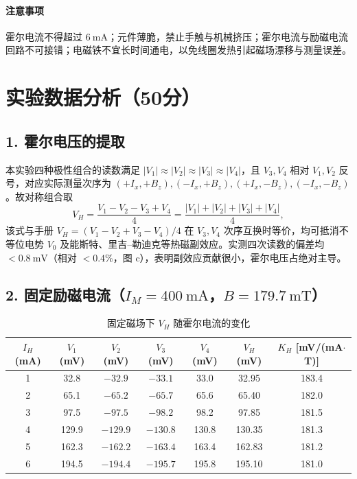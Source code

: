 \documentclass[12pt,a4paper]{ctexart}
\begin{document}
\paragraph{注意事项}
霍尔电流不得超过 $6\ \mathrm{mA}$；元件薄脆，禁止手触与机械挤压；霍尔电流与励磁电流回路不可接错；电磁铁不宜长时间通电，以免线圈发热引起磁场漂移与测量误差。

\section*{实验数据分析（50分）}

\subsection*{1. 霍尔电压的提取}
本实验四种极性组合的读数满足 $|V_1|\approx|V_2|\approx|V_3|\approx|V_4|$，且 $V_3,V_4$ 相对 $V_1,V_2$ 反号，对应实际测量次序为 $(+I_x,+B_z),(-I_x,+B_z),(+I_x,-B_z),(-I_x,-B_z)$。故对称组合取
\begin{equation}
    V_H=\frac{V_1-V_2-V_3+V_4}{4}=\frac{|V_1|+|V_2|+|V_3|+|V_4|}{4},
    \label{eq:VH2}
\end{equation}
该式与手册 $V_H=(V_1-V_2+V_3-V_4)/4$ 在 $V_3,V_4$ 次序互换时等价，均可抵消不等位电势 $V_0$ 及能斯特、里吉--勒迪克等热磁副效应。实测四次读数的偏差均 $<0.8\ \mathrm{mV}$（相对 $<0.4\%$，图 c），表明副效应贡献很小，霍尔电压占绝对主导。

\subsection*{2. 固定励磁电流（$I_M=400\ \mathrm{mA}$，$B=179.7\ \mathrm{mT}$）}
\begin{table}[htbp]\centering\small
\caption{固定磁场下 $V_H$ 随霍尔电流的变化}
\begin{tabular}{ccccccc}\toprule
$I_H$ (mA) & $V_1$ (mV) & $V_2$ (mV) & $V_3$ (mV) & $V_4$ (mV) & $V_H$ (mV) & $K_H$ [mV/(mA$\cdot$T)]\\\midrule
1 &  32.8 &  $-32.9$ &  $-33.1$ &  33.0 &  32.95 & 183.4\\
2 &  65.1 &  $-65.2$ &  $-65.7$ &  65.6 &  65.40 & 182.0\\
3 &  97.5 &  $-97.5$ &  $-98.2$ &  98.2 &  97.85 & 181.5\\
4 & 129.9 & $-129.9$ & $-130.8$ & 130.8 & 130.35 & 181.3\\
5 & 162.3 & $-162.2$ & $-163.4$ & 163.4 & 162.83 & 181.2\\
6 & 194.5 & $-194.4$ & $-195.7$ & 195.8 & 195.10 & 181.0\\\bottomrule
\end{tabular}
\end{table}
\end{document}
